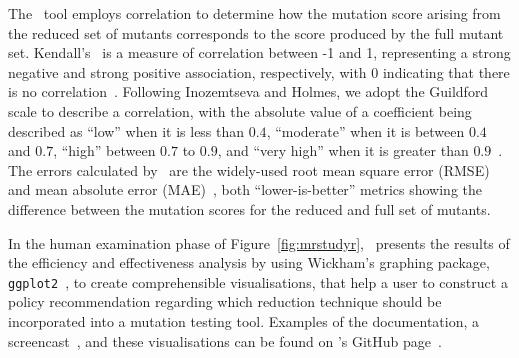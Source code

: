 
The \mr~tool employs correlation to determine how the mutation score arising from the reduced set of mutants corresponds
to the score produced by the full mutant set. Kendall's \taub~is a measure of correlation between -1 and 1, representing
a strong negative and strong positive association, respectively, with 0 indicating that there is no
correlation~\cite{mcleod2015kendall}. Following Inozemtseva and Holmes, we adopt the Guildford scale to describe a
correlation, with the absolute value of a coefficient being described as ``low'' when it is less than $0.4$,
``moderate'' when it is between $0.4$ and $0.7$, ``high'' between $0.7$ to $0.9$, and ``very high'' when it is greater
than $0.9$~\cite{inozemtseva2014coverage}. The errors calculated by \mr~are the widely-used root mean square error
(RMSE) and mean absolute error (MAE)~\cite{chai2014root}, both ``lower-is-better'' metrics showing the difference
between the mutation scores for the reduced and full set of mutants.






In the human examination phase of Figure~\ref{fig:mrstudyr}, \mr~presents the results of the efficiency and
effectiveness analysis by using Wickham's graphing package, \texttt{ggplot2}~\cite{ggplot2}, to create comprehensible
visualisations, that help a user to construct a policy recommendation regarding which reduction technique should be
incorporated into a mutation testing tool. Examples of the documentation, a screencast~\cite{asciinema}, and these
visualisations can be found on \mr's GitHub page~\cite{tool}.


